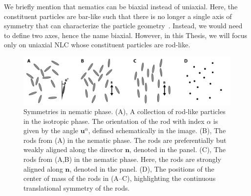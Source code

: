 We briefly mention that nematics can be biaxial instead of uniaxial.
Here, the constituent particles are bar-like such that there is no longer a single axis of symmetry that can characterize the particle geometry~\cite{RN33,RN175}.
Instead, we would need to define two axes, hence the name biaxial.
However, in this Thesis, we will focus only on uniaxial NLC whose constituent particles are rod-like.

\begin{figure}[h]
  \centering
  \includegraphics{figures/C2/Ch2-Figs_NematicSym.png}
  \caption{ Symmetries in nematic phase. (A), A collection of rod-like particles in the isotropic phase.
  The orientation of the rod with index $\alpha$ is given by the angle $\mathbf{u}^{\alpha}$, defined schematically in the image.
  (B), The rods from (A) in the nematic phase.
  The rods are preferentially but weakly aligned along the director $\mathbf{n}$, denoted in the panel.
  (C), The rods from (A,B) in the nematic phase. Here, the rods are strongly aligned along $\mathbf{n}$, denoted in the panel.
  (D), The positions of the center of mass of the rods in (A--C), highlighting the continuous translational symmetry of the rods.}\label{f:2-NematicSym}
\end{figure}

